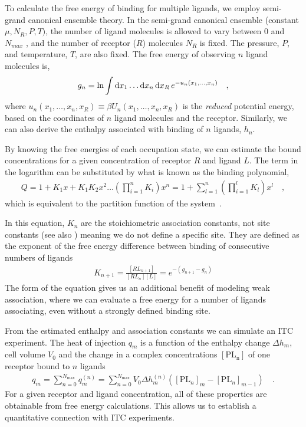 \documentclass[10pt,final]{article}
\begin{document}
To calculate the free energy of binding for multiple ligands, we employ semi-grand canonical ensemble theory.
%
In the semi-grand canonical ensemble (constant $\mu, N_R, P,T)$, the number of ligand molecules is allowed to vary between 0 and $N_{max}$ , and the number of receptor ($R$) molecules $N_R$ is fixed.
%
The pressure, $P$, and temperature, $T$, are also fixed. The free energy of observing $n$ ligand molecules is,
\begin{align}
 g_n = \ln \int \dif x_1 \dots \dif x_n \dif x_R \, e^{-u_n(x_1,\dots,x_n)} \quad,
\end{align}
%
where  $u_n(x_1,\ldots,x_n,x_R) \equiv \beta U_n(x_1,\ldots,x_n,x_R)$ is the \textit{reduced} potential energy, based on the coordinates of $n$ ligand molecules and the receptor. Similarly, we can also derive the enthalpy associated with binding of $n$ ligands, $h_n$.

By knowing the free energies of each occupation state, we can estimate the bound concentrations for a given concentration of receptor $R$ and ligand $L$.
%
The term in the logarithm can be substituted by what is known as the binding polynomial,
%
\begin{align}
 Q = 1 + K_1x + K_1K_2x^2 \dots \left(\prod\limits_{i=1}^{n} K_i\right) x^n = 1 + \sum\limits_{l=1}^n \left(\prod\limits_{i=1}^{l} K_l\right)x^l \quad,
 \label{equation:bindingpolynomial}
\end{align}
which is equivalent to the partition function of the system~\autocite{Dill2010a}.

In this equation, $K_n$ are the stoichiometric association constants, not site constants (see also ) meaning we do not define a specific site.
%
They are defined as the exponent of the free energy difference between binding of consecutive numbers of ligands
\begin{align}
K_{n+1} = \frac{[RL_{n+1}]}{[RL_n][L]} = e^{-(g_{n+1}-g_n)}
\label{eq:K_eq}
\end{align}
%
The form of the equation gives us an additional benefit of modeling weak association, where we can evaluate a free energy for a number of ligands associating, even without a strongly defined binding site.

From the estimated enthalpy and association constants we can simulate an ITC experiment.
%
The heat of injection $q_m$ is a function of the enthalpy change $\Delta h_m$, cell volume $V_0$ and the change in a complex concentrations $[\mathrm{PL_n}]$ of one receptor bound to $n$ ligands
%
\begin{align}
 q_m = \sum \limits_{n=0}^{N_\mathrm{max}} q_m^{(n)} = \sum \limits_{n=0}^{N_\mathrm{max}} V_0 \Delta h_m^{(n)} \left( [\mathrm{PL}_n]_m - [\mathrm{PL}_n]_{m-1} \right) \quad. \label{equation:liberated-heat}
\end{align}
%
For a given receptor and ligand concentration, all of these properties are obtainable from free energy calculations. 
%
This allows us to establish a quantitative connection with ITC experiments.
\end{document}
